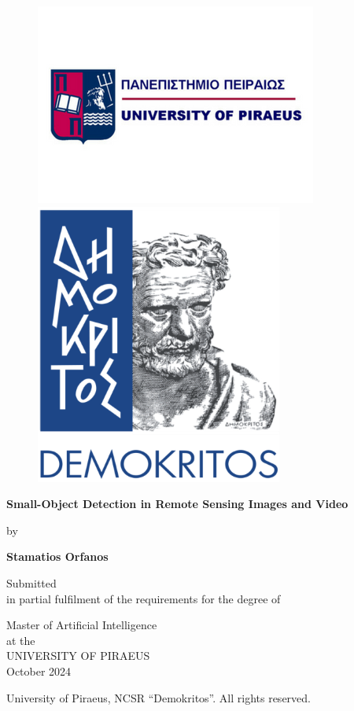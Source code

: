 \begin{titlepage}
    
    \begin{figure}[!h]
        \begin{minipage}{0.48\textwidth}
            \centering
            \includegraphics[width=0.8\linewidth]{Figures/University-of-Piraeus-logo-350x250.png}
        \end{minipage}
        \hfill
        \hfill
        \begin{minipage}{0.48\textwidth}
            \centering
            \includegraphics[width=.25\linewidth]{Figures/demokritos-logo.png}
        \end{minipage}
    \end{figure}

    \vspace{0.5in}


    \centering
    \textbf{\huge Small-Object Detection in Remote Sensing Images and Video}
    
    \vspace{0.2in}
    
    \large by

    \vspace{0.2in}

    \textbf{\Large Stamatios Orfanos}

    \vspace{0.4in}

    \large Submitted \\ in partial fulfilment of the requirements for the degree of 

    \vspace{0.2in}
    
    Master of Artificial Intelligence \\
    at the \\
    UNIVERSITY OF PIRAEUS \\
    October 2024
    
    \vspace{3.0in}
    
    \raggedright \small University of Piraeus, NCSR “Demokritos”. All rights reserved.
\end{titlepage}
